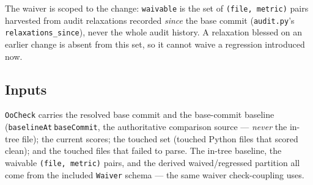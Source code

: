 \documentclass[a4paper,10pt,fleqn]{article}
\begin{document}
The waiver is scoped to the change: \texttt{waivable} is the set of
\texttt{(file, metric)} pairs harvested from audit relaxations recorded
\emph{since} the base commit (\texttt{audit.py}'s \texttt{relaxations\_since}),
never the whole audit history. A relaxation blessed on an earlier change is
absent from this set, so it cannot waive a regression introduced now.

\subsection{Inputs}

\texttt{OoCheck} carries the resolved base commit and the base-commit
baseline (\texttt{baselineAt}$~$\texttt{baseCommit}, the authoritative
comparison source --- \emph{never} the in-tree file); the current scores; the
touched set (touched Python files that scored clean); and the touched files
that failed to parse. The in-tree baseline, the waivable \texttt{(file,
metric)} pairs, and the derived waived/regressed partition all come from the
included \texttt{Waiver} schema --- the same waiver check-coupling uses.
\end{document}
